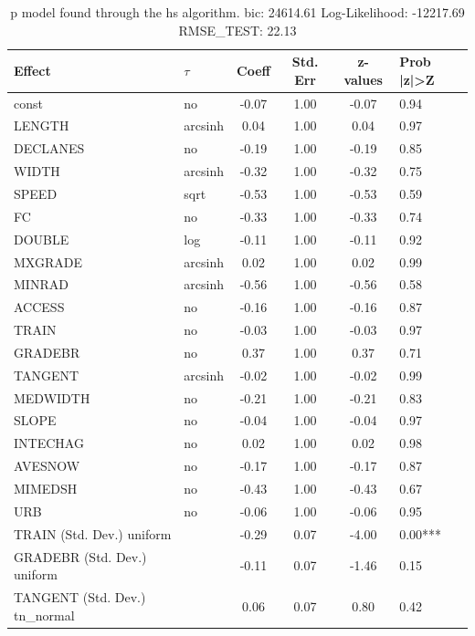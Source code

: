 \begin{table}
	\caption{p model found through the hs algorithm. bic: 24614.61 Log-Likelihood: -12217.69 RMSE_TEST: 22.13}
	\begin{center}
		\begin{tabular}{|l|l|c|c|c|l|}
			\hline
			Effect & $\tau$ & Coeff & Std. Err & z-values & Prob |z|>Z \\
			\hline
			const & no & -0.07 & 1.00 & -0.07 & 0.94 \\
			\hline
			LENGTH & arcsinh & 0.04 & 1.00 & 0.04 & 0.97 \\
			\hline
			DECLANES & no & -0.19 & 1.00 & -0.19 & 0.85 \\
			\hline
			WIDTH & arcsinh & -0.32 & 1.00 & -0.32 & 0.75 \\
			\hline
			SPEED & sqrt & -0.53 & 1.00 & -0.53 & 0.59 \\
			\hline
			FC & no & -0.33 & 1.00 & -0.33 & 0.74 \\
			\hline
			DOUBLE & log & -0.11 & 1.00 & -0.11 & 0.92 \\
			\hline
			MXGRADE & arcsinh & 0.02 & 1.00 & 0.02 & 0.99 \\
			\hline
			MINRAD & arcsinh & -0.56 & 1.00 & -0.56 & 0.58 \\
			\hline
			ACCESS & no & -0.16 & 1.00 & -0.16 & 0.87 \\
			\hline
			TRAIN & no & -0.03 & 1.00 & -0.03 & 0.97 \\
			\hline
			GRADEBR & no & 0.37 & 1.00 & 0.37 & 0.71 \\
			\hline
			TANGENT & arcsinh & -0.02 & 1.00 & -0.02 & 0.99 \\
			\hline
			MEDWIDTH & no & -0.21 & 1.00 & -0.21 & 0.83 \\
			\hline
			SLOPE & no & -0.04 & 1.00 & -0.04 & 0.97 \\
			\hline
			INTECHAG & no & 0.02 & 1.00 & 0.02 & 0.98 \\
			\hline
			AVESNOW & no & -0.17 & 1.00 & -0.17 & 0.87 \\
			\hline
			MIMEDSH & no & -0.43 & 1.00 & -0.43 & 0.67 \\
			\hline
			URB & no & -0.06 & 1.00 & -0.06 & 0.95 \\
			\hline
			TRAIN (Std. Dev.) uniform &  & -0.29 & 0.07 & -4.00 & 0.00*** \\
			\hline
			GRADEBR (Std. Dev.) uniform &  & -0.11 & 0.07 & -1.46 & 0.15 \\
			\hline
			TANGENT (Std. Dev.) tn_normal &  & 0.06 & 0.07 & 0.80 & 0.42 \\

\end{tabular}
\end{center}
\end{table}
